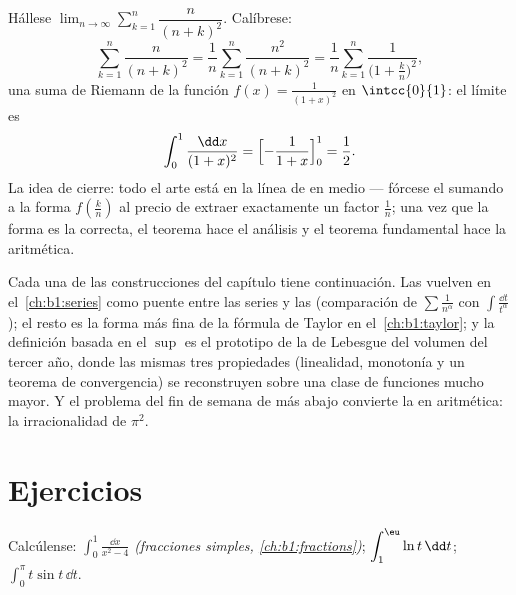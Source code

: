 \begin{example}\label{ex:b1:integration:riemann2}
Hállese $\lim_{n\to\infty} \sum_{k=1}^{n} \dfrac{n}{(n+k)^2}$.
Calíbrese:
\[
\sum_{k=1}^{n} \frac{n}{(n+k)^2}
= \frac{1}{n}\sum_{k=1}^{n} \frac{n^2}{(n+k)^2}
= \frac1n \sum_{k=1}^{n} \frac{1}{\bigl(1 + \frac kn\bigr)^2} ,
\]
una suma de Riemann de la función  $f(x) = \frac{1}{(1+x)^2}$
en $\intcc{0}{1}$: el límite es
\[
\int_0^1 \frac{\dd x}{(1 + x)^2}
= \Bigl[-\frac{1}{1+x}\Bigr]_0^1 = \frac12 .
\]
La idea de cierre: todo el arte está en la línea de en medio ---
fórcese el sumando a la forma $f(\frac kn)$ al precio de extraer
exactamente un factor $\frac1n$; una vez que la forma es la correcta,
el teorema hace el análisis y el teorema fundamental hace la
aritmética.
\end{example}

\begin{remark}
Cada una de las construcciones del capítulo tiene continuación. Las
 vuelven en el~\cref{ch:b1:series} como puente entre
las series y las  (comparación de
$\sum \frac{1}{n^\alpha}$ con $\int \frac{\dd t}{t^\alpha}$); el resto
 es la forma más fina de la fórmula de Taylor en
el~\cref{ch:b1:taylor}; y la definición basada en el $\sup$ es el
prototipo de la  de Lebesgue del volumen del tercer año, donde
las mismas tres propiedades (linealidad, monotonía y un teorema de
convergencia) se reconstruyen sobre una clase de funciones mucho
mayor. Y el problema del fin de semana de más abajo convierte la
 en aritmética: la irracionalidad de $\pi^2$.
\end{remark}

\section{Ejercicios}

\begin{exercise}[$\star$]\label{exo:b1:integration:1}
Calcúlense: $\displaystyle\int_0^1 \frac{\dd x}{x^2 - 4}$
\emph{(fracciones simples, \cref{ch:b1:fractions})};
$\displaystyle\int_1^{\eu} \ln t \,\dd t$;
$\displaystyle\int_0^{\pi} t \sin t\, \dd t$.
\end{exercise}

